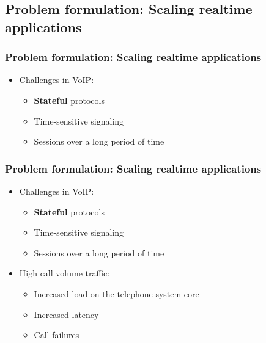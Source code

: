 \documentclass[11pt,t,usepdftitle=false,aspectratio=169]{beamer}
\begin{document}
\subsection{Problem formulation: Scaling realtime applications}
\begin{frame}
	\frametitle{Problem formulation: Scaling {\color{uibkorange} realtime} applications}
	
	\begin{itemize}
		\item Challenges in VoIP:
		\begin{itemize}
			\item \textbf{\color{uibkorange} Stateful} protocols
			\item Time-sensitive signaling
			\item Sessions over a long period of time
		\end{itemize}
	\end{itemize}
\end{frame}

\begin{frame}
	\frametitle{Problem formulation: Scaling {\color{uibkorange} realtime} applications}
	
	\begin{itemize}
		\item Challenges in VoIP:
		\begin{itemize}
			\item \textbf{\color{uibkorange} Stateful} protocols
			\item Time-sensitive signaling
			\item Sessions over a long period of time
		\end{itemize}
		
		\item High call volume traffic: 
		\begin{itemize}
			\item Increased load on the telephone system core
			\item Increased latency
			\item Call failures
		\end{itemize}
	\end{itemize}
\end{frame}
\end{document}
